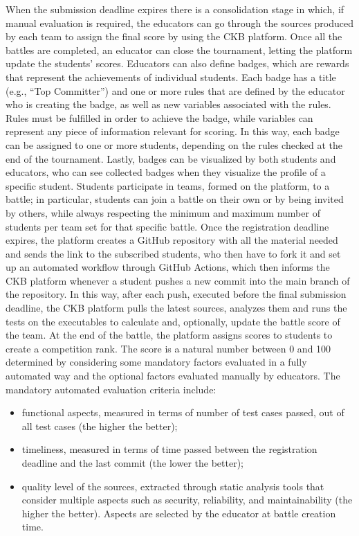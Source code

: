 \documentclass[12pt,oneside,a4paper]{article}
\begin{document}
When the submission deadline expires there is a consolidation stage in which, if manual evaluation is required, the educators can go through the sources produced by each team to assign the final score by using the CKB platform. Once all the battles are completed, an educator can close the tournament, letting the platform update the students' scores.
Educators can also define badges, which are rewards that represent the achievements of individual students. Each badge has a title (e.g., “Top Committer”) and one or more rules that are defined by the educator who is creating the badge, as well as new variables associated with the rules. Rules must be fulfilled in order to achieve the badge, while variables can represent any piece of information relevant for scoring. In this way, each badge can be assigned to one or more students, depending on the rules checked at the end of the tournament. Lastly, badges can be visualized by both students and educators, who can see collected badges when they visualize the profile of a specific student.
Students participate in teams, formed on the platform, to a battle; in particular, students can join a battle on their own or by being invited by others, while always respecting the minimum and maximum number of students per team set for that specific battle. Once the registration deadline expires, the platform creates a GitHub repository with all the material needed and sends the link to the subscribed students, who then have to fork it and set up an automated workflow through GitHub Actions, which then informs the CKB platform whenever a student pushes a new commit into the main branch of the repository. In this way, after each push, executed before the final submission deadline, the CKB platform pulls the latest sources, analyzes them and runs the tests on the executables to calculate and, optionally, update the battle score of the team.
At the end of the battle, the platform assigns scores to students to create a competition rank. The score is a natural number between 0 and 100 determined by considering some mandatory factors evaluated in a fully automated way and the optional factors evaluated manually by educators. The mandatory automated evaluation criteria include:
\begin{itemize}
    \item functional aspects, measured in terms of number of test cases passed, out of all test cases (the higher the better);
    \item timeliness, measured in terms of time passed between the registration deadline and the last commit (the lower the better); 
    \item quality level of the sources, extracted through static analysis tools that consider multiple aspects such as security, reliability, and maintainability (the higher the better). Aspects are selected by the educator at battle creation time.
\end{itemize}
\end{document}

